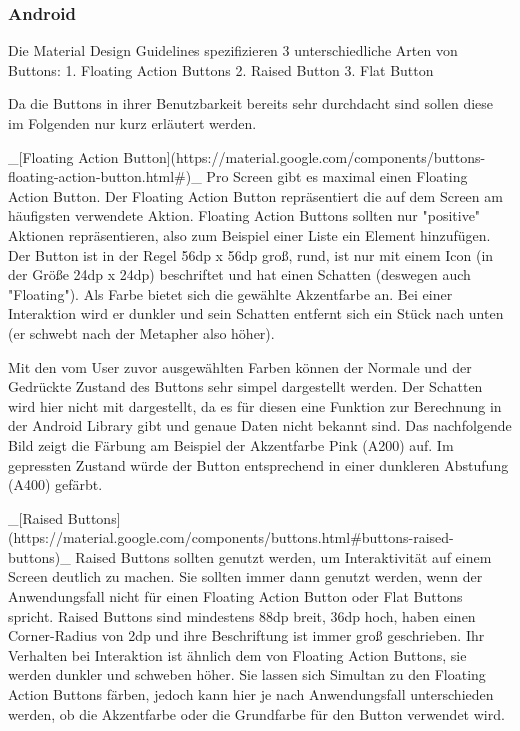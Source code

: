 \subsubsection{Android}

Die Material Design Guidelines spezifizieren 3 unterschiedliche Arten von Buttons:
 1. Floating Action Buttons
 2. Raised Button
 3. Flat Button

Da die Buttons in ihrer Benutzbarkeit bereits sehr durchdacht sind sollen diese im Folgenden nur kurz erläutert werden.

_[Floating Action Button](https://material.google.com/components/buttons-floating-action-button.html#)_
Pro Screen gibt es maximal einen Floating Action Button. Der Floating Action Button repräsentiert die auf dem Screen am häufigsten verwendete Aktion. Floating Action Buttons sollten nur "positive" Aktionen repräsentieren, also zum Beispiel einer Liste ein Element hinzufügen.
Der Button ist in der Regel 56dp x 56dp groß, rund, ist nur mit einem Icon (in der Größe 24dp x 24dp) beschriftet und hat einen Schatten (deswegen auch "Floating"). Als Farbe bietet sich die gewählte Akzentfarbe an. Bei einer Interaktion wird er dunkler und sein Schatten entfernt sich ein Stück nach unten (er schwebt nach der Metapher also höher).


Mit den vom User zuvor ausgewählten Farben können der Normale und der Gedrückte Zustand des Buttons sehr simpel dargestellt werden. Der Schatten wird hier nicht mit dargestellt, da es für diesen eine Funktion zur Berechnung in der Android Library gibt und genaue Daten nicht bekannt sind. Das nachfolgende Bild zeigt die Färbung am Beispiel der Akzentfarbe Pink (A200) auf. Im gepressten Zustand würde der Button entsprechend in einer dunkleren Abstufung (A400) gefärbt.


_[Raised Buttons](https://material.google.com/components/buttons.html#buttons-raised-buttons)_
Raised Buttons sollten genutzt werden, um Interaktivität auf einem Screen deutlich zu machen. Sie sollten immer dann genutzt werden, wenn der Anwendungsfall nicht für einen Floating Action Button oder Flat Buttons spricht.
Raised Buttons sind mindestens 88dp breit, 36dp hoch, haben einen Corner-Radius von 2dp und ihre Beschriftung ist immer groß geschrieben. Ihr Verhalten bei Interaktion ist ähnlich dem von Floating Action Buttons, sie werden dunkler und schweben höher.
Sie lassen sich Simultan zu den Floating Action Buttons färben, jedoch kann hier je nach Anwendungsfall unterschieden werden, ob die Akzentfarbe oder die Grundfarbe für den Button verwendet wird.

